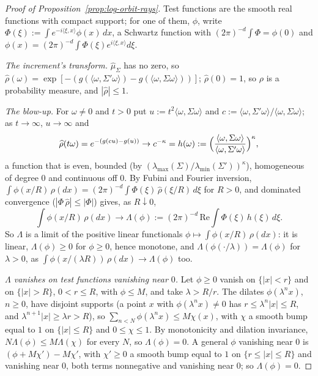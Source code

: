 \begin{proof}[Proof of Proposition~\ref{prop:log-orbit-rays}]
Test functions are the smooth real functions with compact support; for one of them, $\phi$,
write $\Phi(\xi) := \int e^{-i\langle\xi,x\rangle}\phi(x)\,dx$, a Schwartz function with
$(2\pi)^{-d}\int\Phi = \phi(0)$ and $\phi(x) = (2\pi)^{-d}\int\Phi(\xi)e^{i\langle\xi,x\rangle}d\xi$.

\emph{The increment's transform.} $\widehat\mu_\Sigma$ has no zero, so
$\widehat\rho(\omega) = \exp[-(g(\langle\omega,\Sigma'\omega\rangle) - g(\langle\omega,\Sigma\omega\rangle))]$;
$\widehat\rho(0) = 1$, so $\rho$ is a probability measure, and $|\widehat\rho| \le 1$.

\emph{The blow-up.} For $\omega \ne 0$ and $t > 0$ put $u := t^2\langle\omega,\Sigma\omega\rangle$ and
$c := \langle\omega,\Sigma'\omega\rangle/\langle\omega,\Sigma\omega\rangle$; as $t \to \infty$, $u \to \infty$ and
\[
  \widehat\rho(t\omega) = e^{-(g(cu) - g(u))} \to c^{-\kappa}
  = h(\omega) := \Bigl(\frac{\langle\omega,\Sigma\omega\rangle}{\langle\omega,\Sigma'\omega\rangle}\Bigr)^{\kappa} ,
\]
a function that is even, bounded (by $(\lambda_{\max}(\Sigma)/\lambda_{\min}(\Sigma'))^\kappa$), homogeneous
of degree $0$ and continuous off $0$. By Fubini and Fourier inversion,
$\int\phi(x/R)\,\rho(dx) = (2\pi)^{-d}\int\Phi(\xi)\,\widehat\rho(\xi/R)\,d\xi$ for $R > 0$, and dominated
convergence ($|\Phi\,\widehat\rho| \le |\Phi|$) gives, as $R \downarrow 0$,
\[
  \int\phi(x/R)\,\rho(dx) \to \Lambda(\phi) := (2\pi)^{-d}\,\mathrm{Re}\int\Phi(\xi)\,h(\xi)\,d\xi .
\]
So $\Lambda$ is a limit of the positive linear functionals
$\phi \mapsto \int\phi(x/R)\,\rho(dx)$: it is linear, $\Lambda(\phi) \ge 0$ for $\phi \ge 0$, hence
monotone, and $\Lambda(\phi(\cdot/\lambda)) = \Lambda(\phi)$ for $\lambda > 0$, as
$\int\phi(x/(\lambda R))\,\rho(dx) \to \Lambda(\phi)$ too.

\emph{$\Lambda$ vanishes on test functions vanishing near $0$.} Let $\phi \ge 0$ vanish on
$\{|x| < r\}$ and on $\{|x| > R\}$, $0 < r \le R$, with $\phi \le M$, and take
$\lambda > R/r$. The dilates $\phi(\lambda^nx)$, $n \ge 0$, have disjoint supports (a point
$x$ with $\phi(\lambda^nx) \ne 0$ has $r \le \lambda^n|x| \le R$, and $\lambda^{n+1}|x| \ge \lambda r > R$),
so $\sum_{n<N}\phi(\lambda^nx) \le M\chi(x)$, with $\chi$ a smooth bump equal to $1$ on
$\{|x| \le R\}$ and $0 \le \chi \le 1$. By monotonicity and dilation invariance,
$N\Lambda(\phi) \le M\Lambda(\chi)$ for every $N$, so $\Lambda(\phi) = 0$. A general $\phi$ vanishing
near $0$ is $(\phi + M\chi') - M\chi'$, with $\chi' \ge 0$ a smooth bump equal to $1$ on
$\{r \le |x| \le R\}$ and vanishing near $0$, both terms nonnegative and vanishing near $0$; so
$\Lambda(\phi) = 0$.


\end{proof}
